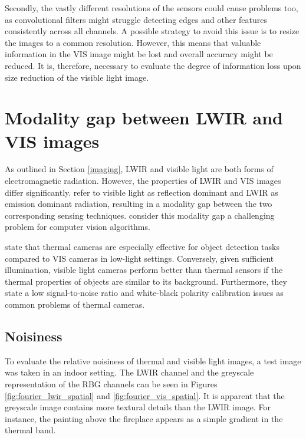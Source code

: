 \documentclass{l4proj}
\begin{document}
Secondly, the vastly different resolutions of the sensors could cause problems too, as convolutional filters might struggle detecting edges and other features consistently across all channels. A possible strategy to avoid this issue is to resize the images to a common resolution. However, this means that valuable information in the VIS image might be lost and overall accuracy might be reduced. It is, therefore, necessary to evaluate the degree of information loss upon size reduction of the visible light image.


\section{Modality gap between LWIR and VIS images}
\label{modality}

As outlined in Section \ref{imaging}, LWIR and visible light are both forms of electromagnetic radiation. However, the properties of LWIR and VIS images differ significantly. \citet{sarfraz_deep_2017} refer to visible light as reflection dominant and LWIR as emission dominant radiation, resulting in a modality gap between the two corresponding sensing techniques. \citet{choi_thermal_2012} consider this modality gap a challenging problem for computer vision algorithms.

\citet{davis_background-subtraction_2007} state that thermal cameras are especially effective for object detection tasks compared to VIS cameras in low-light settings. Conversely, given sufficient illumination, visible light cameras perform better than thermal sensors if the thermal properties of objects are similar to its background. Furthermore, they state a low signal-to-noise ratio and white-black polarity calibration issues as common problems of thermal cameras.

\subsection{Noisiness}

To evaluate the relative noisiness of thermal and visible light images, a test image was taken in an indoor setting. The LWIR channel and the greyscale representation of the RBG channels can be seen in Figures \ref{fig:fourier_lwir_spatial} and \ref{fig:fourier_vis_spatial}. It is apparent that the greyscale image contains more textural details than the LWIR image. For instance, the painting above the fireplace appears as a simple gradient in the thermal band.
\end{document}
